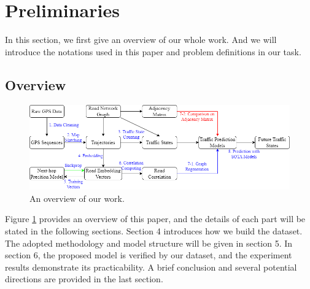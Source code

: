 
\section{Preliminaries}
In this section, we first give an overview of our whole work. And we will introduce the notations used in this paper and problem definitions in our task.

\subsection{Overview}
\begin{figure}[htb]
    \centering
    \includegraphics[width=\textwidth]{images/overview.drawio.png}
    \caption{An overview of our work.}
    \label{fig: overview}
\end{figure}

Figure \ref{fig: overview} provides an overview of this paper, and the details of each part will be stated in the following sections. Section 4 introduces how we build the dataset. The adopted methodology and model structure will be given in section 5. In section 6, the proposed model is verified by our dataset, and the experiment results demonstrate its practicability. A brief conclusion and several potential directions are provided in the last section.

